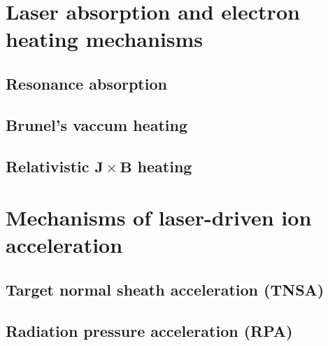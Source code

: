 \documentclass[12pt, twoside, a4paper, openright]{report}
\renewcommand{\vec}[1]{\mathbf{#1}}
\begin{document}
\section{Laser absorption and electron heating mechanisms}


%

\subsection{Resonance absorption}


\subsection{Brunel's vaccum heating}


\subsection{Relativistic $ \vec{J} \times \vec{B} $ heating}
%

\section{Mechanisms of laser-driven ion acceleration}
%

\subsection{Target normal sheath acceleration (TNSA)}
%

\subsection{Radiation pressure acceleration (RPA)}
%

%

%
\end{document}

